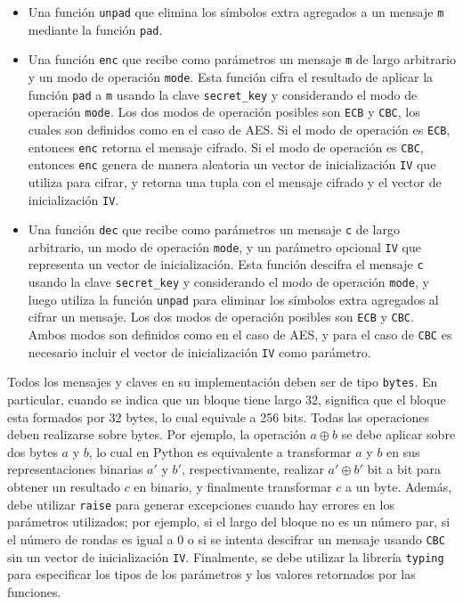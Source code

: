\begin{itemize}
\item Una función \texttt{unpad} que elimina los símbolos extra agregados a un mensaje \texttt{m} mediante la función \texttt{pad}.

\item Una función \texttt{enc} que recibe como parámetros un mensaje \texttt{m} de largo arbitrario y un modo de operación \texttt{mode}. Esta función cifra el resultado de aplicar la función \texttt{pad} a \texttt{m} usando la clave \texttt{secret\_key} y considerando el modo de operación \texttt{mode}. Los dos modos de operación posibles son \texttt{ECB} y \texttt{CBC}, los cuales son definidos como en el caso de AES. Si el modo de operación es \texttt{ECB}, entonces \texttt{enc} retorna el mensaje cifrado. Si el modo de operación es \texttt{CBC}, entonces \texttt{enc} genera de manera aleatoria un vector de inicialización \texttt{IV} que utiliza para cifrar, y retorna una tupla con el mensaje cifrado y el vector de inicialización \texttt{IV}.

\item Una función \texttt{dec} que recibe como parámetros un mensaje \texttt{c} de largo arbitrario, un modo de operación \texttt{mode}, y un parámetro opcional \texttt{IV} que representa un vector de inicialización. Esta función descifra el mensaje \texttt{c} usando la clave \texttt{secret\_key} y considerando el modo de operación \texttt{mode}, y luego utiliza la función \texttt{unpad} para eliminar los símbolos extra agregados al cifrar un mensaje. Los dos modos de operación posibles son \texttt{ECB} y \texttt{CBC}. Ambos modos son definidos como en el caso de AES, y para el caso de \texttt{CBC} es necesario incluir el vector de inicialización \texttt{IV} como parámetro.
\end{itemize}
Todos los mensajes y claves en su implementación deben ser de tipo \texttt{bytes}. En particular, cuando se indica que un bloque tiene largo 32, significa que el bloque esta formados por 32 bytes, lo cual equivale a 256 bits. Todas las operaciones deben realizarse sobre bytes. Por ejemplo, la operación $a \oplus b$ se debe aplicar sobre dos bytes $a$ y $b$, lo cual en Python es equivalente a transformar $a$ y $b$ en sus representaciones binarias $a'$ y $b'$, respectivamente, realizar $a' \oplus b'$ bit a bit para obtener un resultado $c$ en binario, y finalmente transformar $c$ a un byte. Además, debe utilizar \texttt{raise} para generar excepciones cuando hay errores en los parámetros utilizados; por ejemplo, si el largo del bloque no es un número par, si el número de rondas es igual a 0 o si se intenta descifrar un mensaje usando \texttt{CBC} sin un vector de inicialización \texttt{IV}. Finalmente, se debe utilizar la librería \texttt{typing} para especificar los tipos de los parámetros y los valores retornados por las funciones.

